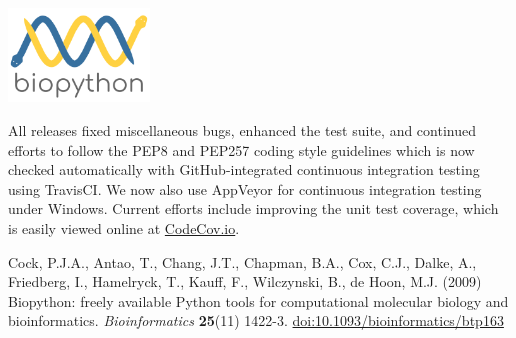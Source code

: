 \documentclass[10pt,oneside]{article}
\begin{document}
\begin{center}
\includegraphics[height=2.5cm]{../presentation/figures/biopython_logo_s.png}
\end{center}

All releases fixed miscellaneous bugs, enhanced the test suite,
and continued efforts to follow the PEP8 and PEP257 coding style guidelines
which is now checked automatically with GitHub-integrated continuous integration
testing using TravisCI.
We now also use AppVeyor for continuous integration testing under Windows.
Current efforts include improving the unit test coverage, which is easily viewed
online at \href{https://codecov.io/github/biopython/biopython/}{CodeCov.io}.

\begin{thebibliography}{}

Cock, P.J.A., Antao, T., Chang, J.T., Chapman, B.A., Cox, C.J., Dalke, A., Friedberg, I., Hamelryck, T., Kauff, F., Wilczynski, B., de Hoon, M.J. (2009) Biopython: freely available Python tools for computational molecular biology and bioinformatics. {\it Bioinformatics} {\bf 25}(11) 1422-3. \href{http://dx.doi.org/10.1093/bioinformatics/btp163}{doi:10.1093/bioinformatics/btp163}

\end{thebibliography}
\end{document}
